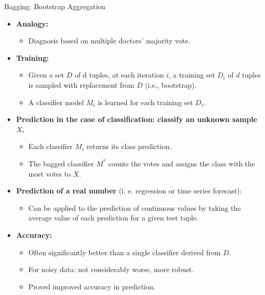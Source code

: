 \begin{frame}{Bagging: Bootstrap Aggregation}
	\begin{itemize}
		\item \textbf{Analogy:}
		      \begin{itemize}
			      \item Diagnosis based on multiple doctors' majority vote.
		      \end{itemize}
		\item \textbf{Training:}
		      \begin{itemize}
			      \item Given a set $D$ of d tuples, at each iteration $i$, a training set $D_i$ of $d$ tuples is sampled with replacement from $D$ (i.e., bootstrap).
			      \item A classifier model $M_i$ is learned for each training set $D_i$.
		      \end{itemize}
		\item \textbf{Prediction in the case of classification: classify an unknown sample $X$.}
		      \begin{itemize}
			      \item Each classifier $M_i$ returns its class prediction.
			      \item The bagged classifier $M^*$ counts the votes and assigns the class with the most votes to $X$.
		      \end{itemize}
		\item \textbf{Prediction of a real number} (i. e. regression or time series forecast):
		      \begin{itemize}
			      \item Can be applied to the prediction of continuous values by taking the average value of each prediction for a given test tuple.
		      \end{itemize}
		\item \textbf{Accuracy:}
		      \begin{itemize}
			      \item Often significantly better than a single classifier derived from $D$.
			      \item For noisy data: not considerably worse, more robust.
			      \item Proved improved accuracy in prediction.
		      \end{itemize}
	\end{itemize}
\end{frame}



